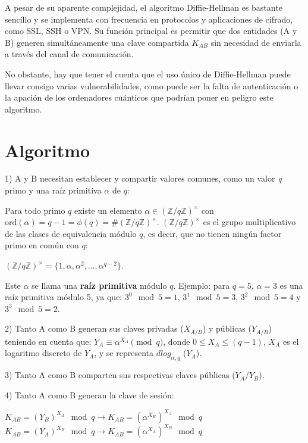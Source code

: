 \documentclass[11pt]{article}
\begin{document}
A pesar de su aparente complejidad, el algoritmo Diffie-Hellman es bastante sencillo y se implementa con frecuencia en protocolos y aplicaciones de cifrado, como SSL, SSH o VPN. Su función principal es permitir que dos entidades (A y B) generen simultáneamente una clave compartida $K_{AB}$ sin necesidad de enviarla a través del canal de comunicación.

No obstante, hay que tener el cuenta que el uso único de Diffie-Hellman puede llevar consigo varias vulnerabilidades, como puede ser la falta de autenticación o la apación de los ordenadores cuánticos que podrían poner en peligro este algoritmo.


\section{Algoritmo}
1) A y B necesitan establecer y compartir valores comunes, como un valor \textit{q} primo y una raíz primitiva $\alpha$  de $q$:

Para todo primo $q$ existe un elemento $\alpha \in (\mathbb{Z}/q\mathbb{Z})^{\times}$ con $\text{ord}(\alpha) = q - 1 = \phi(q) =  \# (\mathbb{Z}/q\mathbb{Z})^{\times}$.
$(\mathbb{Z}/q\mathbb{Z})^{\times}$ es el grupo multiplicativo de las clases de equivalencia módulo $q$, es decir, que no tienen ningún factor primo en común con $q$:
\begin{center}
$(\mathbb{Z}/q\mathbb{Z})^{\times} = \{1, \alpha, \alpha^2, \ldots, \alpha^{q-2}\}$.\\
\end{center}

Este $\alpha$ se llama una \textbf{raíz primitiva} módulo $q$. Ejemplo: para $q = 5$, $\alpha = 3$ es una raíz primitiva módulo 5, ya que:
$3^0 \mod 5 = 1$, $3^1 \mod 5 = 3$, $3^2 \mod 5 = 4$ y $3^3 \mod 5 = 2$.

\newpage

2) Tanto A como B generan sus claves privadas ($X_{A/B}$) y públicas ($Y_{A/B}$) teniendo en cuenta que:  $ Y_{A} \equiv \alpha^{X_A} \pmod{q}$, donde $0 \le X_A \le (q-1)$, $X_A$ es el logaritmo discreto de $Y_A$, y se representa $dlog_{\alpha,q}$ ($Y_A$).

3) Tanto A como B comparten sus respectivas claves públicas ($Y_A$/$Y_B$).

4) Tanto A como B generan la clave de sesión: 
\begin{center}
$K_{AB} = (Y_B)^{X_A} \mod q \rightarrow K_{AB} = (\alpha^{X_B})^{X_A} \mod q$  \\
$K_{AB} = (Y_A)^{X_B} \mod q \rightarrow K_{AB} = (\alpha^{X_A})^{X_B} \mod q$  \\
\end{center}
\end{document}
